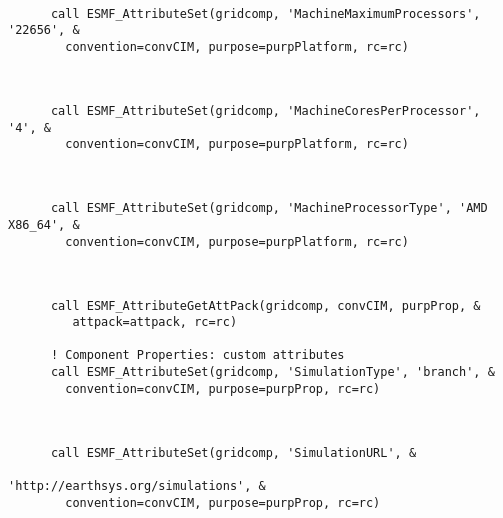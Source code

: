 
 \begin{verbatim}

      call ESMF_AttributeSet(gridcomp, 'MachineMaximumProcessors', '22656', &
        convention=convCIM, purpose=purpPlatform, rc=rc)
 
\end{verbatim}
 

 \begin{verbatim}

      call ESMF_AttributeSet(gridcomp, 'MachineCoresPerProcessor', '4', &
        convention=convCIM, purpose=purpPlatform, rc=rc)
 
\end{verbatim}
 

 \begin{verbatim}

      call ESMF_AttributeSet(gridcomp, 'MachineProcessorType', 'AMD X86_64', &
        convention=convCIM, purpose=purpPlatform, rc=rc)
 
\end{verbatim}
 

 \begin{verbatim}

      call ESMF_AttributeGetAttPack(gridcomp, convCIM, purpProp, &
         attpack=attpack, rc=rc)

      ! Component Properties: custom attributes
      call ESMF_AttributeSet(gridcomp, 'SimulationType', 'branch', &
        convention=convCIM, purpose=purpProp, rc=rc)
 
\end{verbatim}
 

 \begin{verbatim}

      call ESMF_AttributeSet(gridcomp, 'SimulationURL', &
                                       'http://earthsys.org/simulations', &
        convention=convCIM, purpose=purpProp, rc=rc)

 
\end{verbatim}
 
